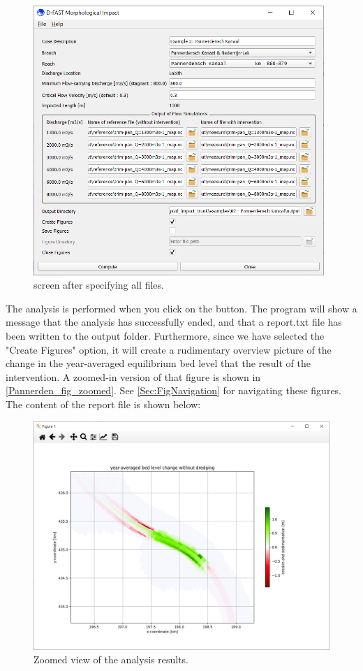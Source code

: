 \begin{figure}
\center
\includegraphics[width=11cm]{figures/Pannerden_config.png}
\caption{\dfmi screen after specifying all files.}
\label{Pannerden_config}
\end{figure}


The \dfmi analysis is performed when you click on the  button.
The program will show a message that the analysis has successfully ended, and that a report.txt file has been written to the output folder.
Furthermore, since we have selected the "Create Figures" option, it will create a rudimentary overview picture of the change in the year-averaged equilibrium bed level that the result of the intervention.
A zoomed-in version of that figure is shown in \autoref{Pannerden_fig_zoomed}.
See \autoref{Sec:FigNavigation} for navigating these figures.
The content of the report file is shown below:

\begin{figure}
\center
\includegraphics[width=\textwidth]{figures/Pannerden_fig_zoomed.png}
\caption{Zoomed view of the analysis results.}
\label{Pannerden_fig_zoomed}
\end{figure}

